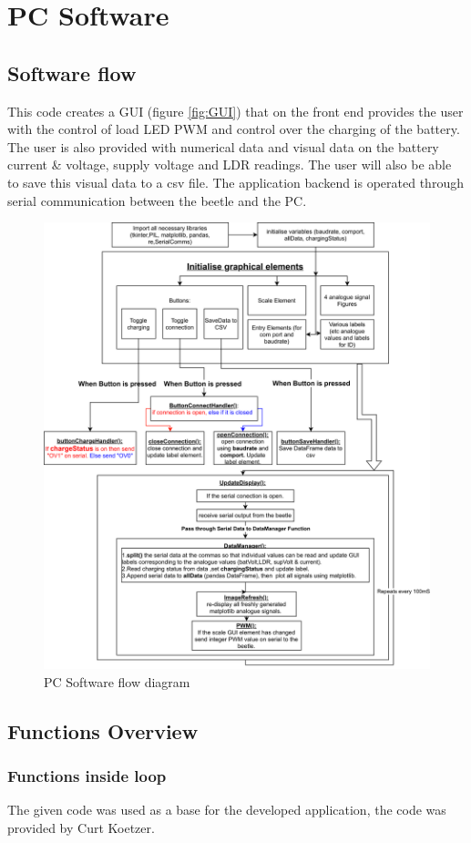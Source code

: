 \chapter{PC Software}
\section{Software flow}
 This code creates a GUI (figure \ref{fig:GUI}) that on the front end provides the user with the control of load LED PWM and control over the charging of the battery. The user is also provided with numerical data and visual data  on the battery current \& voltage, supply voltage and LDR readings. The user will also be able to save this visual data to a csv file. The application backend is operated through serial communication between the beetle and the PC. 
\begin{figure}[!htb]
	\centering
	\includegraphics[width=0.8\linewidth]{Figures/A9/A9.png	}
	\caption{PC Software flow diagram}
	\label{fig:flow}
\end{figure}




\section{Functions Overview}
\subsection{Functions inside loop}
The given code was used as a base for the developed application, the code was provided by Curt Koetzer.
 

